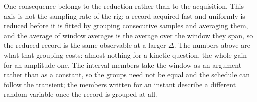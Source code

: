 One consequence belongs to the reduction rather than to the acquisition. This axis is not the
sampling rate of the rig: a record acquired fast and uniformly is reduced before it is fitted by
grouping consecutive samples and averaging them, and the average of window averages is the average
over the window they span, so the reduced record is the same observable at a larger $\Delta$. The
numbers above are what that grouping costs: almost nothing for a kinetic question, the whole gain
for an amplitude one. The interval members take the window as an argument rather than as a constant,
so the groups need not be equal and the schedule can follow the transient; the members written for
an instant describe a different random variable once the record is grouped at all.

